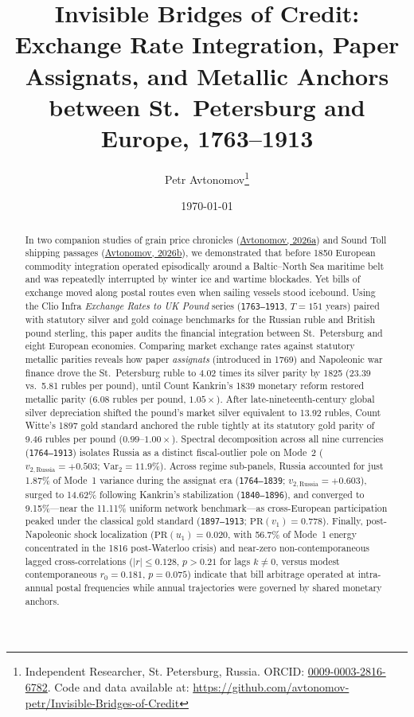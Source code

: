 \documentclass[11pt,a4paper]{article}
\title{\textbf{Invisible Bridges of Credit: Exchange Rate Integration, Paper Assignats, and Metallic Anchors between St.~Petersburg and Europe, 1763--1913}}
\author{
    Petr Avtonomov\thanks{Independent Researcher, St. Petersburg, Russia. ORCID: \href{https://orcid.org}{0009-0003-2816-6782}. Code and data available at: \url{https://github.com/avtonomov-petr/Invisible-Bridges-of-Credit}}
}
\date{\today}
\begin{document}
\maketitle

\begin{abstract}
In two companion studies of grain price chronicles (\href{https://doi.org}{Avtonomov, 2026a}) and Sound Toll shipping passages (\href{https://doi.org}{Avtonomov, 2026b}), we demonstrated that before 1850 European commodity integration operated episodically around a Baltic--North Sea maritime belt and was repeatedly interrupted by winter ice and wartime blockades. Yet bills of exchange moved along postal routes even when sailing vessels stood icebound. Using the Clio Infra \emph{Exchange Rates to UK Pound} series (\texttt{1763--1913}, $T = 151$ years) paired with statutory silver and gold coinage benchmarks for the Russian ruble and British pound sterling, this paper audits the financial integration between St.~Petersburg and eight European economies. Comparing market exchange rates against statutory metallic parities reveals how paper \emph{assignats} (introduced in 1769) and Napoleonic war finance drove the St.~Petersburg ruble to 4.02 times its silver parity by 1825 (23.39 vs.\ 5.81 rubles per pound), until Count Kankrin's 1839 monetary reform restored metallic parity (6.08 rubles per pound, $1.05\times$). After late-nineteenth-century global silver depreciation shifted the pound's market silver equivalent to 13.92 rubles, Count Witte's 1897 gold standard anchored the ruble tightly at its statutory gold parity of 9.46 rubles per pound ($0.99\text{--}1.00\times$). Spectral decomposition across all nine currencies (\texttt{1764--1913}) isolates Russia as a distinct fiscal-outlier pole on Mode~2 ($v_{2,\mathrm{Russia}} = +0.503$; $\mathrm{Var}_2 = 11.9\%$). Across regime sub-panels, Russia accounted for just 1.87\% of Mode~1 variance during the assignat era (\texttt{1764--1839}; $v_{2,\mathrm{Russia}} = +0.603$), surged to 14.62\% following Kankrin's stabilization (\texttt{1840--1896}), and converged to 9.15\%—near the 11.11\% uniform network benchmark—as cross-European participation peaked under the classical gold standard (\texttt{1897--1913}; $\mathrm{PR}(v_1) = 0.778$). Finally, post-Napoleonic shock localization ($\mathrm{PR}(u_1) = 0.020$, with 56.7\% of Mode~1 energy concentrated in the 1816 post-Waterloo crisis) and near-zero non-contemporaneous lagged cross-correlations ($|r| \le 0.128$, $p > 0.21$ for lags $k \neq 0$, versus modest contemporaneous $r_0 = 0.181$, $p = 0.075$) indicate that bill arbitrage operated at intra-annual postal frequencies while annual trajectories were governed by shared monetary anchors.
\end{abstract}
\end{document}
